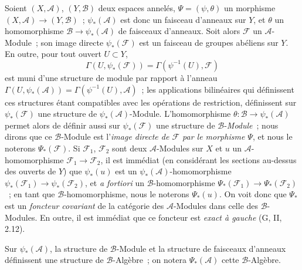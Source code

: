 \begin{env}[4.2.1]
\label{0.4.2.1-fr}
Soient $(X,\mathcal{A})$, $(Y,\mathcal{B})$ deux espaces annelés,
$\Psi=(\psi,\theta)$ un morphisme
$(X,\mathcal{A})\to(Y,\mathcal{B})$~; $\psi_*(\mathcal{A})$ est donc un
faisceau d'anneaux sur $Y$, et $\theta$ un homomorphisme
$\mathcal{B}\to\psi_*(\mathcal{A})$ de faisceaux d'anneaux. Soit alors
$\mathcal{F}$ un $\mathcal{A}$-Module~; son image directe
$\psi_*(\mathcal{F})$ est un faisceau de groupes abéliens sur $Y$. En outre,
pour tout ouvert $U\subset Y$,
\[
  \Gamma(U,\psi_*(\mathcal{F}))
  =\Gamma(\psi^{-1}(U),\mathcal{F})
\]
est muni d'une structure de module par rapport à l'anneau
$\Gamma(U,\psi_*(\mathcal{A}))=\Gamma(\psi^{-1}(U),\mathcal{A})$~; les
applications bilinéaires qui définissent ces structures étant compatibles
avec les opérations de restriction, définissent sur $\psi_*(\mathcal{F})$ une
structure de $\psi_*(\mathcal{A})$-Module. L'homomorphisme
$\theta:\mathcal{B}\to\psi_*(\mathcal{A})$ permet alors de définir aussi sur
$\psi_*(\mathcal{F})$ une structure de $\mathcal{B}$-\emph{Module}~; nous dirons que
ce $\mathcal{B}$-Module est l'\emph{image directe de $\mathcal{F}$ par le
morphisme $\Psi$}, et nous le noterons $\Psi_*(\mathcal{F})$. Si
$\mathcal{F}_1$, $\mathcal{F}_2$ sont deux $\mathcal{A}$-Modules sur $X$ et
$u$ un $\mathcal{A}$-homomorphisme $\mathcal{F}_1\to\mathcal{F}_2$, il est
immédiat (en considérant les sections au-dessus des ouverts de $Y$) que
$\psi_*(u)$ est un $\psi_*(\mathcal{A})$-homomorphisme
$\psi_*(\mathcal{F}_1)\to\psi_*(\mathcal{F}_2)$, et \emph{a fortiori} un
$\mathcal{B}$-homomorphisme
$\Psi_*(\mathcal{F}_1)\to\Psi_*(\mathcal{F}_2)$~; en tant que
$\mathcal{B}$-homomorphisme, nous le noterons $\Psi_*(u)$. On voit donc que
$\Psi_*$ est un \emph{foncteur covariant} de la catégorie des
$\mathcal{A}$-Modules dans celle des $\mathcal{B}$-Modules. En outre, il est
immédiat que ce foncteur est \emph{exact à gauche} (G, II, 2.12).

Sur $\psi_*(\mathcal{A})$, la structure de $\mathcal{B}$-Module et la
structure de faisceaux d'anneaux définissent une structure de
$\mathcal{B}$-Algèbre~; on notera $\Psi_*(\mathcal{A})$ cette
$\mathcal{B}$-Algèbre.
\end{env}

